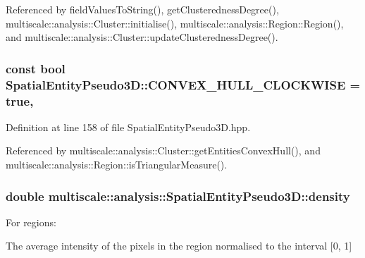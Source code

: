 Referenced by field\-Values\-To\-String(), get\-Clusteredness\-Degree(), multiscale\-::analysis\-::\-Cluster\-::initialise(), multiscale\-::analysis\-::\-Region\-::\-Region(), and multiscale\-::analysis\-::\-Cluster\-::update\-Clusteredness\-Degree().

\hypertarget{classmultiscale_1_1analysis_1_1SpatialEntityPseudo3D_ad92f43d2b14c77def3f7a70b54810dd2}{
\subsubsection[{C\-O\-N\-V\-E\-X\-\_\-\-H\-U\-L\-L\-\_\-\-C\-L\-O\-C\-K\-W\-I\-S\-E}]{\setlength{\rightskip}{0pt plus 5cm}const bool Spatial\-Entity\-Pseudo3\-D\-::\-C\-O\-N\-V\-E\-X\-\_\-\-H\-U\-L\-L\-\_\-\-C\-L\-O\-C\-K\-W\-I\-S\-E = true\hspace{0.3cm}{\ttfamily [static]}, {\ttfamily [protected]}}}\label{classmultiscale_1_1analysis_1_1SpatialEntityPseudo3D_ad92f43d2b14c77def3f7a70b54810dd2}


Definition at line 158 of file Spatial\-Entity\-Pseudo3\-D.\-hpp.



Referenced by multiscale\-::analysis\-::\-Cluster\-::get\-Entities\-Convex\-Hull(), and multiscale\-::analysis\-::\-Region\-::is\-Triangular\-Measure().

\hypertarget{classmultiscale_1_1analysis_1_1SpatialEntityPseudo3D_aedf807816f8c2f7cd961acfe0042fc56}{
\subsubsection[{density}]{\setlength{\rightskip}{0pt plus 5cm}double multiscale\-::analysis\-::\-Spatial\-Entity\-Pseudo3\-D\-::density\hspace{0.3cm}{\ttfamily [protected]}}}\label{classmultiscale_1_1analysis_1_1SpatialEntityPseudo3D_aedf807816f8c2f7cd961acfe0042fc56}
\begin{DoxyVerb}                 For regions:
\end{DoxyVerb}
 The average intensity of the pixels in the region normalised to the interval \mbox{[}0, 1\mbox{]}


